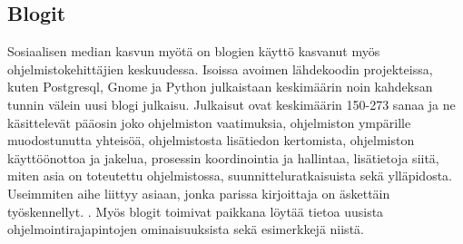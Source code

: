 \documentclass[finnish]{../tktltiki2}
\theoremstyle{definition}
\theoremstyle{remark}
\begin{document}
\subsection{Blogit}
Sosiaalisen median kasvun myötä on blogien käyttö kasvanut myös ohjelmistokehittäjien keskuudessa. Isoissa avoimen lähdekoodin projekteissa, kuten Postgresql, Gnome ja Python julkaistaan keskimäärin noin kahdeksan tunnin välein uusi blogi julkaisu. Julkaisut ovat keskimäärin 150-273 sanaa ja ne käsittelevät pääosin joko ohjelmiston vaatimuksia, ohjelmiston ympärille muodostunutta yhteisöä, ohjelmistosta lisätiedon kertomista, ohjelmiston käyttöönottoa ja jakelua, prosessin koordinointia ja hallintaa, lisätietoja siitä, miten asia on toteutettu ohjelmistossa, suunnitteluratkaisuista sekä ylläpidosta. Useimmiten aihe liittyy asiaan, jonka parissa kirjoittaja on äskettäin työskennellyt. \cite{how-dev-blog}.
Myös blogit toimivat paikkana löytää tietoa uusista ohjelmointirajapintojen ominaisuuksista sekä esimerkkejä niistä.


\end{document}
